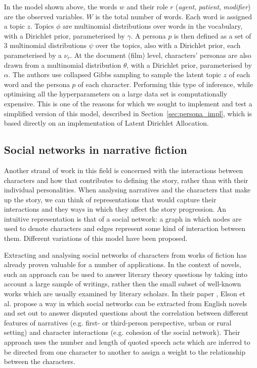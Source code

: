 \documentclass[bsc,frontabs,singlespacing,parskip, twoside]{infthesis}
\begin{document}
In the model shown above, the words $w$ and their role $r$ (\textit{agent}, \textit{patient}, \textit{modifier}) are the observed variables. $W$ is the total number of words. Each word is assigned a topic $z$. Topics $\phi$ are multinomial distributions over words in the vocabulary, with a Dirichlet prior, parameterised by $\gamma$. A persona $p$ is then defined as a set of 3 multinomial distributions $\psi$ over the topics, also with a Dirichlet prior, each parameterised by a $\nu_r$. At the document (film) level, characters' personas are also drawn from a multinomial distribution $\theta$, with a Dirichlet prior, parameterised by $\alpha$. The authors use collapsed Gibbs sampling \cite{griffiths2004finding} to sample the latent topic $z$ of each word and the persona $p$ of each character. Performing this type of inference, while optimising all the hyperparameters on a large data set is computationally expensive. This is one of the reasons for which we sought to implement and test a simplified version of this model, described in Section~\ref{sec:persona_impl}, which is based directly on an implementation of Latent Dirichlet Allocation.

\subsection{Social networks in narrative fiction}
Another strand of work in this field is concerned with the interactions between characters and how that contributes to defining the story, rather than with their individual personalities. When analysing narratives and the characters that make up the story, we can think of representations that would capture their interactions and they ways in which they affect the story progression. An intuitive representation is that of a social network: a graph in which nodes are used to denote characters and edges represent some kind of interaction between them. Different variations of this model have been proposed.

Extracting and analysing social networks of characters from works of fiction has already proven valuable for a number of applications. In the context of novels, such an approach can be used to answer literary theory questions by taking into account a large sample of writings, rather then the small subset of well-known works which are usually examined by literary scholars. In their paper \cite{Elson2010}, Elson et al. propose a way in which social networks can be extracted from English novels and set out to answer disputed questions about the correlation between different features of narratives (e.g. first- or third-person perspective, urban or rural setting) and character interactions (e.g. cohesion of the social network). Their approach uses the number and length of quoted speech acts which are inferred to be directed from one character to another to assign a weight to the relationship between the characters.
\end{document}
